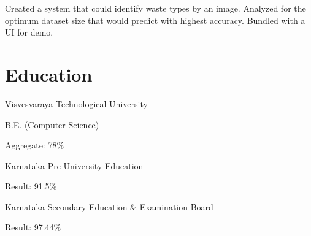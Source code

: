 \documentclass{resume_v02}
\begin{document}
Created a system that could identify waste types by an image. Analyzed for the optimum dataset size that would predict with highest accuracy.  Bundled with a UI for demo.

\section{Education}
\par Visvesvaraya Technological University
\par B.E. (Computer Science)
\par Aggregate: 78\%

\par Karnataka Pre-University Education
\par Result: 91.5\%

\par Karnataka Secondary Education \& Examination Board
\par Result: 97.44\%
\end{document}
